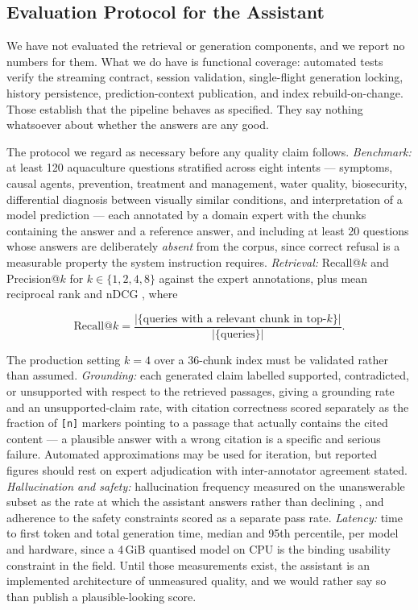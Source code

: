 \documentclass[conference]{IEEEtran}
\begin{document}
\subsection{Evaluation Protocol for the Assistant}
\label{subsec:ragEval}

We have not evaluated the retrieval or generation components, and we report no numbers for them. What we do have is functional coverage: automated tests verify the streaming contract, session validation, single-flight generation locking, history persistence, prediction-context publication, and index rebuild-on-change. Those establish that the pipeline behaves as specified. They say nothing whatsoever about whether the answers are any good.

The protocol we regard as necessary before any quality claim follows. \emph{Benchmark:} at least 120 aquaculture questions stratified across eight intents --- symptoms, causal agents, prevention, treatment and management, water quality, biosecurity, differential diagnosis between visually similar conditions, and interpretation of a model prediction --- each annotated by a domain expert with the chunks containing the answer and a reference answer, and including at least 20 questions whose answers are deliberately \emph{absent} from the corpus, since correct refusal is a measurable property the system instruction requires. \emph{Retrieval:} Recall@$k$ and Precision@$k$ for $k\in\{1,2,4,8\}$ against the expert annotations, plus mean reciprocal rank and nDCG \cite{b42}, where

\begin{equation}
\mathrm{Recall}@k = \frac{|\{\text{queries with a relevant chunk in top-}k\}|}
{|\{\text{queries}\}|} .
\label{eq:recall}
\end{equation}

The production setting $k=4$ over a 36-chunk index must be validated rather than assumed. \emph{Grounding:} each generated claim labelled supported, contradicted, or unsupported with respect to the retrieved passages, giving a grounding rate and an unsupported-claim rate, with citation correctness scored separately as the fraction of \texttt{[n]} markers pointing to a passage that actually contains the cited content --- a plausible answer with a wrong citation is a specific and serious failure. Automated approximations \cite{b40} may be used for iteration, but reported figures should rest on expert adjudication with inter-annotator agreement stated. \emph{Hallucination and safety:} hallucination frequency measured on the unanswerable subset as the rate at which the assistant answers rather than declining \cite{b41}, and adherence to the safety constraints scored as a separate pass rate. \emph{Latency:} time to first token and total generation time, median and 95th percentile, per model and hardware, since a 4\,GiB quantised model on CPU is the binding usability constraint in the field. Until those measurements exist, the assistant is an implemented architecture of unmeasured quality, and we would rather say so than publish a plausible-looking score.
\end{document}
